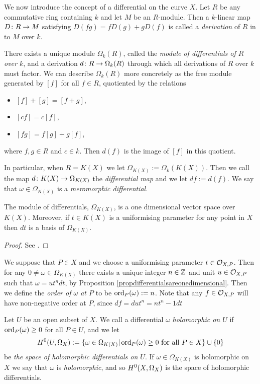 We now introduce the concept of a differential on the curve $X$.
Let $R$ be any commutative ring containing $k$ and let $M$ be an $R$-module.
Then a $k$-linear map $D \colon R \rightarrow M$ satisfying $D(fg) = fD(g) + gD(f)$ is called a \emph{derivation} of $R$ in to $M$ over $k$.

There exists a unique module $\Omega_k(R)$, called the \emph{module of differentials of $R$ over $k$}, and a derivation $d \colon R \rightarrow \Omega_k(R)$ through which all derivations of $R$ over $k$ must factor.
We can describe $\Omega_k(R)$ more concretely as the free module generated by $[f]$ for all $f \in R$, quotiented by the relations
    \begin{itemize}
    \item $[f]+[g] = [f+g]$,
    \item $[cf] = c[f]$,
    \item $[fg] = f[g] + g[f]$,
    \end{itemize}
where $f, g \in R$ and $c \in k$.
Then $d(f)$ is the image of $[f]$ in this quotient.

In particular, when $R = K(X)$ we let $\Omega_{K(X)} := \Omega_k(K(X))$.
Then we call the map $d \colon K(X) \rightarrow \Omega_{K(X)}$ the \emph{differential map} and we let $df := d(f)$.
We say that $\omega \in \Omega_{K(X)}$ is a \emph{meromorphic differential}.

    \begin{prop}\label{propdifferentialsareonedimensional}
    The module of differentials, $\Omega_{K(X)}$, is a one dimensional vector space over $K(X)$.
    Moreover, if $t \in K(X)$ is a uniformising parameter for any point in $X$ then $dt$ is a basis of $\Omega_{K(X)}$.
    \end{prop}
    \begin{proof}
    See \cite[Prop. 1.5.9]{stichtenoth}.
    \end{proof}

We suppose that $P \in X$ and we choose a uniformising parameter $t \in {\cal O}_{X,P}$.
Then for any $ 0 \neq \omega \in \Omega_{K(X)}$ there exists a unique integer $n \in {\mathbb Z}$ and unit $u \in {\cal O}_{X,P}$ such that $\omega = ut^ndt$, by Proposition \ref{propdifferentialsareonedimensional}.
Then we define the \emph{order of $\omega$ at $P$} to be $\operatorname{ord}_P(\omega) := n$.
Note that any $f\in {\cal O}_{X,P}$ will have non-negative order at $P$, since $df = dut^n = nt^n-1dt$

Let $U$ be an open subset of $X$.
We call a differential $\omega$ \emph{holomorphic on $U$} if $\operatorname{ord}_P(\omega) \geq 0$ for all $P \in U$, and we let
    \[
    H^0(U, \Omega_X) := \{ \omega \in \Omega_{K(X)} | \operatorname{ord}_P(\omega) \geq 0\ \text{for all}\ P \in X\} \cup \{ 0 \}
    \]
be \emph{the space of holomorphic differentials on $U$}.
If $\omega \in \Omega_{K(X)}$ is holomorphic on $X$ we say that $\omega$ is \emph{holomorphic}, and so ${H^0(X,\Omega_X)}$ is the space of holomorphic differentials.

